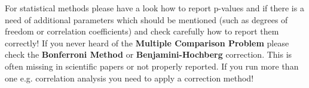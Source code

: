 For statistical methods please have a look how to report p-values and if there is a need of additional parameters which should be mentioned (such as degrees of freedom or correlation coefficients) and check carefully how to report them correctly! If you never heard of the \textbf{Multiple Comparison Problem} please check the \textbf{Bonferroni Method} or \textbf{Benjamini-Hochberg} correction. This is often missing in scientific papers or not properly reported. If you run more than one e.g. correlation analysis you need to apply a correction method! 